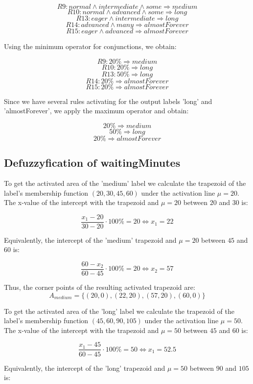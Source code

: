 \[ R9: normal \wedge intermediate \wedge some \Rightarrow medium \]
\[ R10: normal \wedge advanced  \wedge some \Rightarrow long \]
\[ R13: eager \wedge intermediate \Rightarrow long \]
\[ R14: advanced \wedge many \Rightarrow almostForever \]
\[ R15: eager \wedge advanced \Rightarrow almostForever \]

Using the minimum operator for conjunctions, we obtain:

\[ R9: 20\% \Rightarrow medium \]
\[ R10: 20\% \Rightarrow long \]
\[ R13: 50\% \Rightarrow long \]
\[ R14: 20\% \Rightarrow almostForever \]
\[ R15: 20\% \Rightarrow almostForever \]

Since we have several rules activating for the output labels 'long' and 'almostForever', we apply the maximum operator and obtain:

\[ 20\% \Rightarrow medium \]
\[ 50\% \Rightarrow long \]
\[ 20\% \Rightarrow almostForever \]

\subsection{Defuzzyfication of waitingMinutes}


To get the activated area of the 'medium' label we calculate the trapezoid of the label's membership function $(20,30,45,60)$ under the activation line $\mu = 20$. The x-value of the intercept with the trapezoid and $\mu = 20$ between $20$ and $30$ is:

\[ \frac{x_1-20}{30-20} \cdot 100\% = 20 \Leftrightarrow x_1 = 22 \]

Equivalently, the intercept of the 'medium' trapezoid and $\mu = 20$ between $45$ and $60$ is:

\[ \frac{60-x_2}{60-45} \cdot 100\% = 20 \Leftrightarrow x_2 = 57 \]

Thus, the corner points of the resulting activated trapezoid are: 
\[A_{medium} = \{ (20,0), (22,20), (57,20), (60,0) \}\]


To get the activated area of the 'long' label we calculate the trapezoid of the label's membership function $(45,60,90,105)$ under the activation line $\mu = 50$. The x-value of the intercept with the trapezoid and $\mu = 50$ between $45$ and $60$ is:

\[ \frac{x_1-45}{60-45} \cdot 100\% = 50 \Leftrightarrow x_1 = 52.5 \]

Equivalently, the intercept of the 'long' trapezoid and $\mu = 50$ between $90$ and $105$ is:


